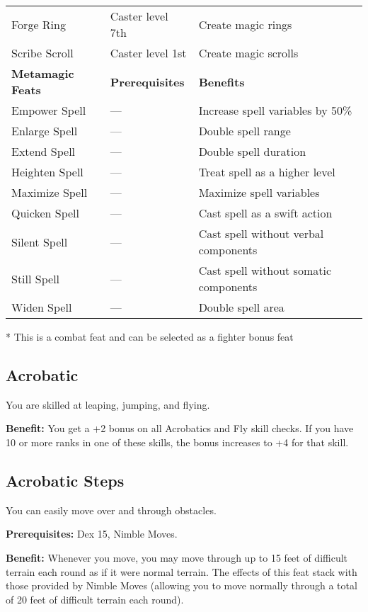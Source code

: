 \begin{table*}
\begin{tabularx}{\linewidth}{lXl}
Forge Ring & Caster level 7th & Create magic rings\\
Scribe Scroll & Caster level 1st & Create magic scrolls\\
\textbf{Metamagic Feats} & \textbf{Prerequisites} & \textbf{Benefits}\\
Empower Spell & --- & Increase spell variables by 50\%\\
Enlarge Spell & --- & Double spell range\\
Extend Spell & --- & Double spell duration\\
Heighten Spell & --- & Treat spell as a higher level\\
Maximize Spell & --- & Maximize spell variables\\
Quicken Spell & --- & Cast spell as a swift action\\
Silent Spell & --- & Cast spell without verbal components\\
Still Spell & --- & Cast spell without somatic components\\
Widen Spell & --- & Double spell area\\
\end{tabularx}
* This is a combat feat and can be selected as a fighter bonus feat
\end{table*}

				
\subsection{Acrobatic}

				
You are skilled at leaping, jumping, and flying.
				
\textbf{Benefit:} You get a +2 bonus on all Acrobatics and Fly skill checks. If you have 10 or more ranks in one of these skills, the bonus increases to +4 for that skill.
				
\subsection{Acrobatic Steps}

				
You can easily move over and through obstacles.
				
\textbf{Prerequisites:} Dex 15, Nimble Moves.
				
\textbf{Benefit:} Whenever you move, you may move through up to 15 feet of difficult terrain each round as if it were normal terrain. The effects of this feat stack with those provided by Nimble Moves (allowing you to move normally through a total of 20 feet of difficult terrain each round).
				
